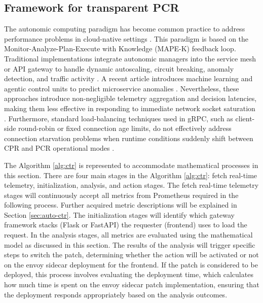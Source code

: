 \documentclass{ieeeaccess}
\begin{document}
	
	\subsection{Framework for transparent PCR}
	
	The autonomic computing paradigm has become common practice to address performance problems in cloud-native settings \cite{armstrong2017towards}.  This paradigm is 
	based on the Monitor-Analyze-Plan-Execute with Knowledge (MAPE-K) feedback loop.  Traditional implementations integrate autonomic managers into the service mesh or API gateway to handle dynamic autoscaling, circuit breaking, anomaly detection, and traffic activity \cite{carnevali2025compositional}. A recent article introduces machine learning and agentic control units to predict microservice anomalies \cite{toka2021machine}. Nevertheless, these approaches introduce non-negligible telemetry aggregation and decision latencies, making them less effective in responding to immediate network socket saturation \cite{qiu2020firm}. Furthermore, standard load-balancing techniques used in gRPC, such as client-side round-robin or fixed connection age limits, do not effectively address connection starvation problems when runtime conditions suddenly shift between CPR and PCR operational modes \cite{dautov2014utilising}.
	
	
	
	The Algorithm \ref{alg:ctr} is represented to accommodate mathematical processes in this section. There are four main stages in the Algorithm \ref{alg:ctr}: fetch real-time telemetry, initialization, analysis, and action stages. The fetch real-time telemetry stages will continuously accept all metrics from Prometheus required in the following process. Further acquired metric descriptions will be explained in Section \ref{sec:auto-ctr}. The initialization stages will identify which gateway framework stacks (Flask or FastAPI) the requester (frontend) uses to load the request. In the analysis stages, all metrics are evaluated using the mathematical model as discussed in this section. The results of the analysis will trigger specific steps to switch the patch, determining whether the action will be activated or not on the envoy sidecar deployment for the frontend. If the patch is considered to be deployed, this process involves evaluating the deployment time, which calculates how much time is spent on the envoy sidecar patch implementation, ensuring that the deployment responds appropriately based on the analysis outcomes.
	
\end{document}

